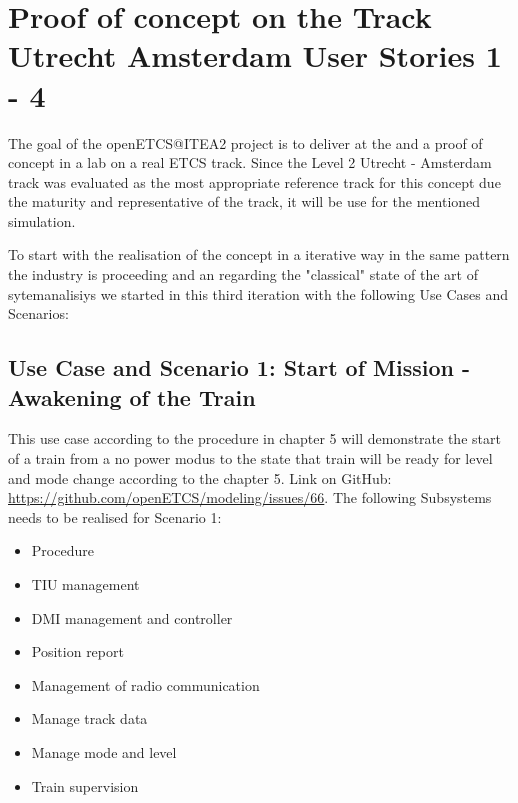 
\section{Proof of concept on the Track Utrecht Amsterdam User Stories 1 - 4}

The goal of the openETCS@ITEA2 project is to deliver at the and a proof of concept in a lab on a real ETCS track. Since the Level 2 Utrecht - Amsterdam track was evaluated as the most appropriate reference track for this concept due the maturity and representative of the track, it will be use for the mentioned simulation.

To start with the realisation of the concept in a iterative way in the same pattern the industry is proceeding and an regarding the "classical" state of the art of sytemanalisiys we started in this third iteration with the following Use Cases and Scenarios:

\subsection{Use Case and Scenario 1: Start of Mission - Awakening of the Train}
This use case according to the procedure in chapter 5 will demonstrate the start of a train from a no power modus to the state that train will be ready for level and mode change according to the chapter 5. Link on GitHub: \url{https://github.com/openETCS/modeling/issues/66}. The following Subsystems needs to be realised for Scenario 1:
\begin{itemize}
\item Procedure
\item TIU management
\item DMI management and controller
\item Position report
\item Management of radio communication
\item Manage track data
\item Manage mode and level
\item Train supervision
\end{itemize}

